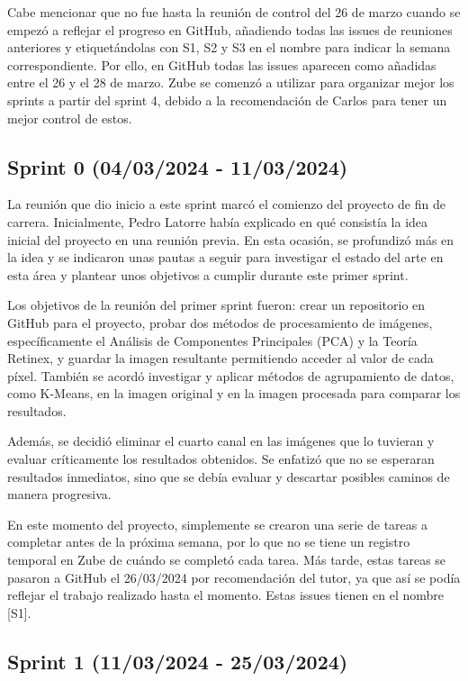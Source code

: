 Cabe mencionar que no fue hasta la reunión de control del 26 de marzo cuando se empezó a reflejar el progreso en GitHub, añadiendo todas las issues de reuniones anteriores y etiquetándolas con S1, S2 y S3 en el nombre para indicar la semana correspondiente. Por ello, en GitHub todas las issues aparecen como añadidas entre el 26 y el 28 de marzo. Zube se comenzó a utilizar para organizar mejor los sprints a partir del sprint 4, debido a la recomendación de Carlos para tener un mejor control de estos.

\subsection{Sprint 0 (04/03/2024 - 11/03/2024)}\label{sprint-0}

La reunión que dio inicio a este sprint marcó el comienzo del proyecto de fin de carrera. Inicialmente, Pedro Latorre había explicado en qué consistía la idea inicial del proyecto en una reunión previa. En esta ocasión, se profundizó más en la idea y se indicaron unas pautas a seguir para investigar el estado del arte en esta área y plantear unos objetivos a cumplir durante este primer sprint.

Los objetivos de la reunión del primer sprint fueron: crear un repositorio en GitHub para el proyecto, probar dos métodos de procesamiento de imágenes, específicamente el Análisis de Componentes Principales (PCA) y la Teoría Retinex, y guardar la imagen resultante permitiendo acceder al valor de cada píxel. También se acordó investigar y aplicar métodos de agrupamiento de datos, como K-Means, en la imagen original y en la imagen procesada para comparar los resultados.

Además, se decidió eliminar el cuarto canal en las imágenes que lo tuvieran y evaluar críticamente los resultados obtenidos. Se enfatizó que no se esperaran resultados inmediatos, sino que se debía evaluar y descartar posibles caminos de manera progresiva.

En este momento del proyecto, simplemente se crearon una serie de tareas a completar antes de la próxima semana, por lo que no se tiene un registro temporal en Zube de cuándo se completó cada tarea. Más tarde, estas tareas se pasaron a GitHub el 26/03/2024 por recomendación del tutor, ya que así se podía reflejar el trabajo realizado hasta el momento. Estas issues tienen en el nombre [S1].

\subsection{Sprint 1 (11/03/2024 - 25/03/2024)}\label{sprint-1}

